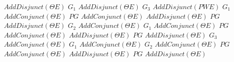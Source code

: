{\bTR									\bTD[nr=2]	$	AddDisjunct(\Theta E)	$	\eTD	\bTD	$	G_1	$	\eTD	\bTD	$	AddDisjunct(\Theta E)	$	\eTD	\eTR
\bTR														\bTD	$	G_3	$	\eTD	\bTD	$	AddDisjunct(P W E)	$	\eTD	\eTR
\bTR				\bTD[nr=2]	$	G_1	$	\eTD	\bTD	$	AddConjunct(\Theta E)	$	\eTD	\bTD	$	PG	$	\eTD	\bTD	$	AddConjunct(\Theta E)	$	\eTD	\eTR
\bTR									\bTD	$	AddDisjunct(\Theta E)	$	\eTD	\bTD	$	PG	$	\eTD	\bTD	$	AddDisjunct(\Theta E)	$	\eTD	\eTR
\bTR				\bTD[nr=3]	$	G_2	$	\eTD	\bTD[nr=2]	$	AddConjunct(\Theta E)	$	\eTD	\bTD	$	G_1	$	\eTD	\bTD	$	AddConjunct(\Theta E)	$	\eTD	\eTR
\bTR													\eTD	\bTD	$	PG	$	\eTD	\bTD	$	AddConjunct(\Theta E)	$	\eTD	\eTR
\bTR									\bTD	$	AddDisjunct(\Theta E)	$	\eTD	\bTD	$	PG	$	\eTD	\bTD	$	AddDisjunct(\Theta E)	$	\eTD	\eTR
\bTR				\bTD[nr=4]	$	G_3	$	\eTD	\bTD[nr=3]	$	AddConjunct(\Theta E)	$	\eTD	\bTD	$	G_1	$	\eTD	\bTD	$	AddConjunct(\Theta E)	$	\eTD	\eTR
\bTR														\bTD	$	G_2	$	\eTD	\bTD	$	AddConjunct(\Theta E)	$	\eTD	\eTR
\bTR														\bTD	$	PG	$	\eTD	\bTD	$	AddConjunct(\Theta E)	$	\eTD	\eTR
\bTR									\bTD	$	AddDisjunct(\Theta E)	$	\eTD	\bTD	$	PG	$	\eTD	\bTD	$	AddDisjunct(\Theta E)	$	\eTD	\eTR
\eTABLEbody
\eTABLE
}

